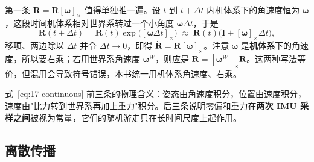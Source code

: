 第一条 $\dot{\bm{R}}=\bm{R}[\bm{\omega}]_\times$ 值得单独推一遍。设 $t$ 到 $t+\Delta t$ 内机体系下的角速度恒为 $\bm{\omega}$，这段时间机体系相对世界系转过一个小角度 $\bm{\omega}\Delta t$，于是
\begin{equation}
  \bm{R}(t+\Delta t)=\bm{R}(t)\exp\bigl([\bm{\omega}\Delta t]_\times\bigr)
  \;\approx\;\bm{R}(t)\bigl(\bm{I}+[\bm{\omega}]_\times\Delta t\bigr),
\end{equation}
移项、两边除以 $\Delta t$ 并令 $\Delta t\to0$，即得 $\dot{\bm{R}}=\bm{R}[\bm{\omega}]_\times$。注意 $\bm{\omega}$ 是\textbf{机体系}下的角速度，所以要右乘；若用世界系角速度 $\bm{\omega}^{W}$，则应是 $\dot{\bm{R}}=[\bm{\omega}^{W}]_\times\bm{R}$。这两种写法等价，但混用会导致符号错误，本书统一用机体系角速度、右乘。

式~\eqref{eq:17-continuous} 前三条的物理含义：姿态由角速度积分，位置由速度积分，速度由"比力转到世界系再加上重力"积分。后三条说明零偏和重力在\textbf{两次 IMU 采样之间}被视为常量，它们的随机游走只在长时间尺度上起作用。

\subsection{离散传播}

